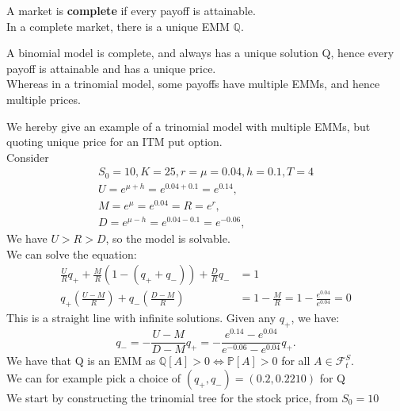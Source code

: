 \begin{theorem}
    A market is \textbf{complete} if every payoff is attainable.\\
    In a complete market, there is a unique EMM $\mathbb{Q}$.
\end{theorem}

A binomial model is complete, and always has a unique solution Q, 
hence every payoff is attainable and has a unique price.\\
Whereas in a trinomial model, some payoffs have multiple EMMs, and hence multiple prices.\\

\begin{example}
We hereby give an example of a trinomial model with multiple EMMs, but quoting unique price for an ITM put option.\\
Consider
\begin{align*}
    S_0 = 10, K = 25, r = \mu = 0.04, h = 0.1, T = 4\\
    U = e^{\mu + h} = e^{0.04 + 0.1} = e^{0.14}, \\
    M = e^{\mu} = e^{0.04} = R = e^r , \\
    D = e^{\mu - h} = e^{0.04 - 0.1} = e^{-0.06}, 
\end{align*}
We have $U > R > D$, so the model is solvable.\\
We can solve the equation:
\begin{align*}
    \frac{U}{R}q_+ + \frac{M}{R}(1 - (q_+ + q_-)) + \frac{D}{R}q_- &= 1 \\
    q_+\left(\frac{U - M}{R}\right) + q_-\left(\frac{D - M}{R}\right) &= 1 - \frac{M}{R} = 1 - \frac{e^{0.04}}{e^{0.04}} = 0
\end{align*}
This is a straight line with infinite solutions. Given any $ q_+ $, we have:
$$
q_- = - \frac{U-M}{D-M}q_+ =
- \frac{e^{0.14} - e^{0.04}}{e^{-0.06} - e^{0.04}}q_+.
$$
We have that Q is an EMM as $\mathbb{Q}[A] > 0 
\iff \mathbb{P}[A] > 0 $ for all $A \in \mathcal{F}^S_t$.\\
We can for example pick a choice of $ (q_+, q_-) = (0.2, 0.2210) $ for Q \\
We start by constructing the trinomial tree for the stock price, from $ S_0 = 10 $ 


\end{example}
